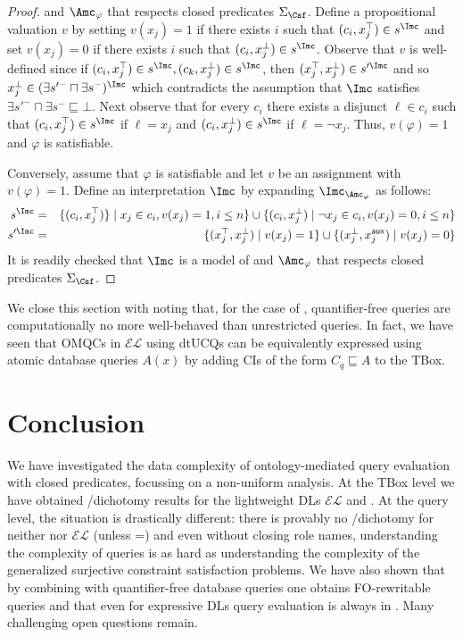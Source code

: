 \documentclass{lmcs}
\theoremstyle{definition}
\begin{document}
\begin{proof}
  \Tmc and $\Amc_{\varphi}$ that respects closed predicates
  $\Sigma_{\Csf}$.  Define a propositional valuation $v$ by setting
  $v(x_{j})= 1$ if there exists $i$ such that
  $(c_{i},x_{j}^{\top})\in s^{\Imc}$ and set $v(x_{j})=0$ if there exists
  $i$ such that $(c_{i},x_{j}^{\bot})\in s^{\Imc}$. Observe that $v$ is
  well-defined since if $(c_{i},x_{j}^{\top})\in s^{\Imc}, (c_{k},x_{j}^{\bot})
  \in s^{\Imc}$, then $(x_{j}^{\top},x_{j}^{\bot})\in s'^{\Imc}$ and so
  $x_{j}^{\bot}\in (\exists s'^{-} \sqcap \exists s^{-})^{\Imc}$ which
  contradicts the assumption that $\Imc$ satisfies $\exists s'^{-}
  \sqcap \exists s^{-} \sqsubseteq \bot$. Next observe that for every
  $c_{i}$ there exists a disjunct $\ell\in c_{i}$ such that
  $(c_{i},x_{j}^{\top})\in s^{\Imc}$ if $\ell= x_{j}$ and
  $(c_{i},x_{j}^{\bot})\in s^{\Imc}$ if $\ell=\neg x_{j}$. Thus,
  $v(\varphi)=1$ and $\varphi$ is satisfiable.

  Conversely, assume that $\varphi$ is satisfiable and let $v$ be an
  assignment with $v(\varphi)=1$. Define an interpretation $\Imc$ by expanding $\Imc_{\Amc_{\varphi}}$ as follows:
  \begin{eqnarray*}
    s^{\Imc}  & =  & \{ (c_{i},x_{j}^{\top})\} \mid x_{j}\in c_{i}, v(x_{j})=1,i\leq n\} \cup  \{ (c_{i},x_{j}^{\bot}) \mid \neg x_{j}\in c_{i}, v(x_{j}) =0,i\leq n\}\\
    s'^{\Imc}  & =  & \{ (x_{j}^{\top},x_{j}^{\bot}) \mid v(x_{j})=1\} \cup \{ (x_{j}^{\bot},x_{j}^{{\sf aux}}) \mid v(x_{j})=0\}
  \end{eqnarray*}
  It is readily checked that $\Imc$ is a model of \Tmc and
  $\Amc_{\varphi}$ that respects closed predicates $\Sigma_\Csf$.
\end{proof}
%
We close this section with noting that, for the case of \EL, quantifier-free queries are computationally no more
well-behaved than unrestricted queries. In fact, we have seen that OMQCs in $\mathcal{EL}$ using dtUCQs can be
equivalently expressed using atomic database queries $A(x)$ by adding CIs of the form $C_{q}\sqsubseteq A$ to
the TBox.

\section{Conclusion}
%
We have investigated the data complexity of ontology-mediated query
evaluation with closed predicates, focussing on a non-uniform
analysis. At the TBox level we have obtained \ptime/\conp dichotomy
results for the lightweight DLs $\mathcal{EL}$ and \dlliter. At the
query level, the situation is drastically different: there is provably
no \ptime/\conp dichotomy for neither \dlliter nor $\mathcal{EL}$
(unless \ptime=\conp) and even without closing role names,
understanding the complexity of queries is as hard as understanding
the complexity of the generalized surjective constraint satisfaction
problems.  We have also shown that by combining \dlliter with
quantifier-free database queries one obtains FO-rewritable queries and
that even for expressive DLs query evaluation is always in \conp. Many
challenging open questions remain.
\end{document}
